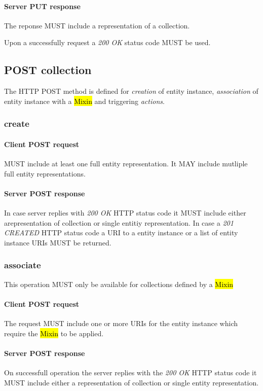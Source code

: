 \documentclass[10pt,a4paper]{article}
\begin{document}
\paragraph{Server PUT response}
The reponse MUST include a representation of a collection.

Upon a successfully request a \emph{200 OK} status code MUST be used.

\subsection{POST collection}
The HTTP POST method is defined for {\em creation} of entity instance, {\em association} of entity instance with a \hl{Mixin} and triggering {\em actions}.

\subsubsection{create}

\paragraph{Client POST request}
MUST include at least one full entity representation. It MAY include mutliple full entity representations.

\paragraph{Server POST response}
In case server replies with \emph{200 OK} HTTP status code it MUST include either arepresentation of collection or single entitiy representation. In case a \emph{201 CREATED} HTTP status code a URI to a entity instance or a list of entity instance URIs MUST be returned.

\subsubsection{associate}
This operation MUST only be available for collections defined by a \hl{Mixin}

\paragraph{Client POST request}
The request MUST include one or more URIs for the entity instance which require the \hl{Mixin} to be applied.

\paragraph{Server POST response}
On successfull operation the server replies with the \emph{200 OK} HTTP status code it MUST include either a representation of collection or single entity representation. 
\end{document}

